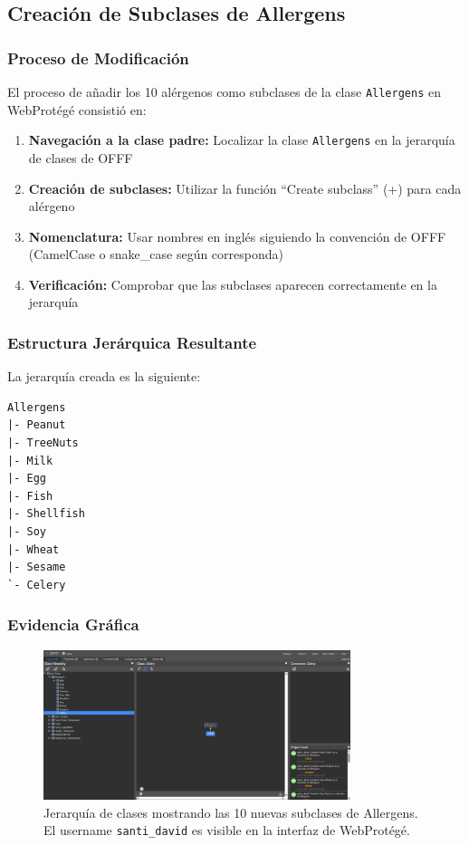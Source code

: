 \documentclass[12pt,a4paper]{article}
\begin{document}
\subsection{Creación de Subclases de Allergens}

\subsubsection{Proceso de Modificación}

El proceso de añadir los 10 alérgenos como subclases de la clase \texttt{Allergens} en WebProtégé consistió en:

\begin{enumerate}
    \item \textbf{Navegación a la clase padre:} Localizar la clase \texttt{Allergens} en la jerarquía de clases de OFFF
    \item \textbf{Creación de subclases:} Utilizar la función ``Create subclass'' (+) para cada alérgeno
    \item \textbf{Nomenclatura:} Usar nombres en inglés siguiendo la convención de OFFF (CamelCase o snake\_case según corresponda)
    \item \textbf{Verificación:} Comprobar que las subclases aparecen correctamente en la jerarquía
\end{enumerate}

\subsubsection{Estructura Jerárquica Resultante}

La jerarquía creada es la siguiente:

\begin{verbatim}
Allergens
|- Peanut
|- TreeNuts
|- Milk
|- Egg
|- Fish
|- Shellfish
|- Soy
|- Wheat
|- Sesame
`- Celery
\end{verbatim}


\subsubsection{Evidencia Gráfica}

\begin{figure}[H]
    \centering
    \includegraphics[width=0.8\textwidth]{screenshots/Allergens.png}
    \caption{Jerarquía de clases mostrando las 10 nuevas subclases de Allergens. El username \texttt{santi\_david} es visible en la interfaz de WebProtégé.}
    \label{fig:allergens_hierarchy}
\end{figure}
\end{document}
